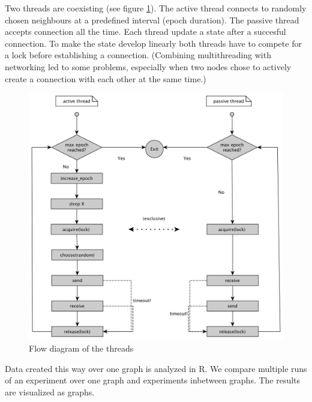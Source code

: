 \documentclass[11pt,a4paper]{article}
\begin{document}
Two threads are coexisting (see figure \ref{fig:flow_diag}). The active thread connects to randomly chosen neighbours at a predefined interval (epoch duration). The passive thread accepts connection all the time. Each thread update a state after a succesful connection. To make the state develop linearly both threads have to compete for a lock before establishing a connection. (Combining multithreading with networking led to some problems, especially when two nodes chose to actively create a connection with each other at the same time.)
\begin{figure}[h!]
    \begin{center}
        \includegraphics[scale=0.25]{flow_diag.jpg}
    \end{center}
    \caption{Flow diagram of the threads}
    \label{fig:flow_diag}
\end{figure}

Data created this way over one graph is analyzed in R. We compare multiple runs of an experiment over one graph and experiments inbetween graphs. The results are visualized as graphs.
\end{document}
